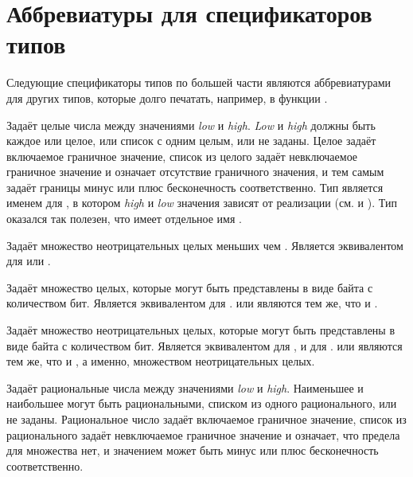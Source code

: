 \section{Аббревиатуры для спецификаторов типов}

Следующие спецификаторы типов по большей части являются аббревиатурами для других
типов, которые долго печатать, например, в функции .
\begin{flushdesc}

\item[\cd{(integer \emph{low} \emph{high})}]
  Задаёт целые числа между значениями \emph{low} и
  \emph{high}. \emph{Low} и \emph{high} должны быть
  каждое или целое, или список с одним целым, или не заданы.
  Целое задаёт включаемое граничное значение, список из целого задаёт невключаемое
  граничное значение и \cd{*} означает отсутствие граничного значения, и тем самым
  задаёт границы минус или плюс бесконечность соответственно.
  Тип  является именем для , в котором \emph{high} и \emph{low}
  значения зависят от реализации (см.  и
  ).
  Тип  оказался так полезен, что имеет отдельное имя .

\item[\cd{(mod \emph{n})}]
  Задаёт множество неотрицательных целых меньших чем . Является эквивалентом
  для  или .

\item[\cd{(signed-byte \emph{s})}]
  Задаёт множество целых, которые могут быть представлены в виде байта с 
  количеством бит. Является эквивалентом для .
   или  являются тем же, что и .

\item[\cd{(unsigned-byte \emph{s})}]
  Задаёт множество неотрицательных целых, которые могут быть представлены в виде байта с 
  количеством бит. Является эквивалентом для , и для .
   или  являются тем же, что и
  , а именно, множеством неотрицательных целых.

\item[\cd{(rational \emph{low} \emph{high})}]
  Задаёт рациональные числа между значениями \emph{low} и
  \emph{high}. Наименьшее и наибольшее могут быть рациональными, списком
  из одного рационального, или не заданы.
  Рациональное число задаёт включаемое граничное значение, список из
  рационального задаёт невключаемое граничное значение и \cd{*} означает, что
  предела для множества нет, и значением может быть минус или плюс бесконечность соответственно.


\end{flushdesc}

